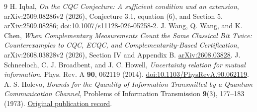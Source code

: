 \documentclass[11pt]{article}
\theoremstyle{remark}
\begin{document}
\begin{thebibliography}{9}
H. Iqbal,
\emph{On the CQC Conjecture: A sufficient condition and an extension},
arXiv:2509.08286v2 (2026), Conjecture 3.1, equation (6), and Section 5.
\href{https://arxiv.org/abs/2509.08286}{arXiv:2509.08286};
\href{https://doi.org/10.1007/s11128-026-05258-2}{doi:10.1007/s11128-026-05258-2}.
J. Wang, Q. Wang, and K. Chen,
\emph{When Complementary Measurements Count the Same Classical Bit Twice: Counterexamples to CQC, ECQC, and Complementarity-Based Certification},
arXiv:2608.03828v2 (2026), Section IV and Appendix B.
\href{https://arxiv.org/abs/2608.03828}{arXiv:2608.03828}.
J. Schneeloch, C. J. Broadbent, and J. C. Howell,
\emph{Uncertainty relation for mutual information},
Phys. Rev. A \textbf{90}, 062119 (2014).
\href{https://doi.org/10.1103/PhysRevA.90.062119}{doi:10.1103/PhysRevA.90.062119}.
A. S. Holevo,
\emph{Bounds for the Quantity of Information Transmitted by a Quantum Communication Channel},
Problems of Information Transmission \textbf{9}(3), 177--183 (1973).
\href{https://www.mathnet.ru/eng/ppi903}{Original publication record}.
\end{thebibliography}
\end{document}
